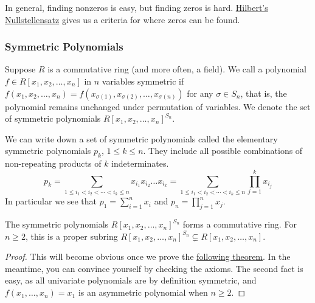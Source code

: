 \begin{remark}
    In general, finding nonzeros is easy, but finding zeros is hard.
    \hyperref[thm:nullstellensatz]{Hilbert's Nullstellensatz}
    gives us a criteria for where zeros can be found.
\end{remark}

\subsubsection*{Symmetric Polynomials}

\begin{definition}
    Suppose \(R\) is a commutative ring (and more often, a field).
    We call a polynomial \(f \in R[x_1,x_2,\hdots,x_n]\) in \(n\) variables
    symmetric if \(f(x_1,x_2,\hdots,x_n)
    = f(x_{\sigma(1)},x_{\sigma(2)},\hdots,x_{\sigma(n)})\)
    for any \(\sigma \in S_n\),
    that is, the polynomial remains unchanged under permutation of variables.
    We denote the set of symmetric polynomials \({R[x_1,x_2,\hdots,x_n]}^{S_n}\).
\end{definition}
\begin{definition}
    We can write down a set of symmetric polynomials called
    the elementary symmetric polynomials \(p_k\), \(1 \leq k \leq n\).
    They include all possible combinations of
    non-repeating products of \(k\) indeterminates.
    \begin{equation*}
        p_k = \sum_{1 \leq i_1 < i_2 < \cdots < i_k \leq n}
        x_{i_1}x_{i_2} \hdots x_{i_k}
        = \sum_{1 \leq i_1 < i_2 < \cdots < i_k \leq n}
        \prod_{j=1}^k x_{i_j}
    \end{equation*}
    In particular we see that \(p_1 = \sum_{i=1}^n x_i\)
    and \(p_n = \prod_{j=1}^n x_j\).
\end{definition}
\begin{proposition}
    The symmetric polynomials \({R[x_1,x_2,\hdots,x_n]}^{S_n}\)
    forms a commutative ring.
    For \(n \geq 2\),
    this is a proper subring \({R[x_1,x_2,\hdots,x_n]}^{S_n}
    \subsetneq R[x_1,x_2,\hdots,x_n]\).
\end{proposition}
\begin{proof}
    This will become obvious once we prove
    the \hyperref[thm:fundamental-sym-polynomial]{following theorem}.
    In the meantime,
    you can convince yourself by checking the axioms.
    The second fact is easy,
    as all univariate polynomials are by definition symmetric,
    and \(f(x_1,\hdots,x_n) = x_1\) is an asymmetric polynomial
    when \(n \geq 2\).
\end{proof}

